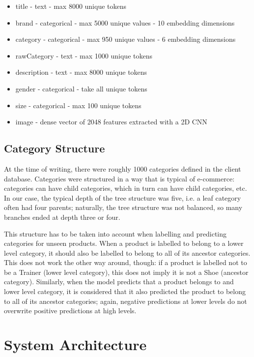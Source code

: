 \begin{itemize}[noitemsep]
  \item title - text - max 8000 unique tokens
  \item brand - categorical - max 5000 unique values - 10 embedding dimensions
  \item category - categorical - max 950 unique values - 6 embedding dimensions
  \item rawCategory - text - max 1000 unique tokens
  \item description - text - max 8000 unique tokens
  \item gender - categorical - take all unique tokens
  \item size - categorical - max 100 unique tokens
  \item image - dense vector of 2048 features extracted with a 2D CNN
\end{itemize}

\subsection{Category Structure}
\label{cat_tree}

At the time of writing, there were roughly 1000 categories defined in the client database.
Categories were structured in a way that is typical of  e-commerce:  categories can have  child categories, which in turn can have child categories, etc.
In our case, the typical depth of the tree structure was five, i.e. a leaf category often had four parents;  naturally, the tree structure was not balanced, so many branches ended at depth three or four.

This structure has to be taken into account when labelling and  predicting categories for unseen products.
When a product is labelled to belong to a  lower level category,  it should also be labelled to belong to all of its ancestor categories. This does not work the other way around, though:  if a product is labelled not to be a Trainer (lower level category),  this does not imply it is not a Shoe (ancestor category).
Similarly, when the model predicts that a product belongs to and  lower level category, it is considered that it also predicted the product to belong to all of its  ancestor categories;  again, negative predictions at lower levels do not  overwrite positive predictions at high levels.

\section{System Architecture}
\label{architecture}


